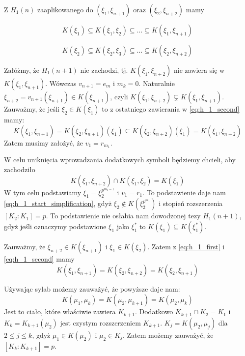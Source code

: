 Z $H_1(n)$ zaaplikowanego do $\left(\xi_1, \xi_{n+1}\right)$ oraz $\left(\xi_2,
\xi_{n+2}\right)$ mamy

\begin{equation}
  K\left(\xi_1\right) \subseteq
  K\left(\xi_1, \xi_2\right) \subseteq
  \ldots \subseteq
  K\left(\xi_1, \xi_{n+1}\right)
  \label{eq:h_1_first}
\end{equation}

\begin{equation}
  K\left(\xi_2\right) \subseteq
  K\left(\xi_2, \xi_3\right) \subseteq
  \ldots \subseteq
  K\left(\xi_2, \xi_{n+2}\right)
  \label{eq:h_1_second}
\end{equation}

Załóżmy, że $H_1(n+1)$ nie zachodzi, tj. $K\left(\xi_1, \xi_{n+2}\right)$ nie
zawiera się w $K\left(\xi_1, \xi_{n+1}\right)$. Wówczas $v_{n+1} = e_m$ i $m_k =
0$.
Naturalnie $\xi_{n+2} = v_{n+1}\left(\xi_{n+1}\right) \in
K\left(\xi_{n+1}\right)$, czyli 
${K\left(\xi_1, \xi_{n+2}\right) \subsetneq
K\left(\xi_1, \xi_{n+1}\right)}$.
Zauważmy, że jeśli $\xi_2 \in K\left(\xi_1\right)$ to z ostatniego zawierania w
\ref{eq:h_1_second} mamy:
\[
  K\left(\xi_1, \xi_{n+1}\right) =
  K\left(\xi_2, \xi_{n+1}\right)\left(\xi_1\right) \subseteq
  K\left(\xi_2, \xi_{n+2}\right)\left(\xi_1\right) =
K\left(\xi_1, \xi_{n+2}\right)\]
Zatem musimy założyć, że $v_1 = r_{m_1}$.

W celu uniknięcia wprowadzania dodatkowych symboli będziemy chcieli, aby
zachodziło 
\begin{equation}
K\left(\xi_1, \xi_{n+2}\right) \cap
K\left(\xi_1, \xi_2\right) = K\left(\xi_1\right)
\label{eq:h_1_start_simplification}
\end{equation}
W tym celu podstawiamy $\xi_1 = \xi_2^{p^{m_1-1}}$ i $v_1 = r_1$. To
podstawienie daje nam \ref{eq:h_1_start_simplification}, gdyż $\xi_2 \not \in
K\left(\xi_2^{p^{m_1}}\right)$ i stopień rozszerzenia $\left[K_2 : K_1\right] =
p$. To podstawienie nie osłabia nam dowodzonej tezy $H_1(n+1)$, gdyż jeśli
oznaczymy podstawione $\xi_1$ jako $\xi_1^*$ to $K\left(\xi_1\right) \subseteq
K\left(\xi_1^*\right)$.

Zauważmy, że
$\xi_{n+2} \in K\left(\xi_{n+1}\right)$ i $\xi_{1} \in K\left(\xi_{2}\right)$.
Zatem z \ref{eq:h_1_first} i \ref{eq:h_1_second} mamy
\[
  K\left(\xi_1, \xi_{n+1}\right) =
  K\left(\xi_2, \xi_{n+2}\right) =
  K\left(\xi_2, \xi_{n+1}\right)
\]

Używając sylab możemy zauważyć, że powyższe daje nam:
\[
  K\left(\mu_1, \mu_{k}\right) =
  K\left(\mu_2, \mu_{k+1}\right) =
  K\left(\mu_2, \mu_{k}\right)
\]
Jest to ciało, które właściwie zawiera $K_{k+1}$. Dodatkowo $K_{k+1} \cap K_2 =
K_1$ i $K_k = K_{k+1}\left(\mu_2\right)$ jest czystym rozszerzeniem $K_{k+1}$.
$K_j = K\left(\mu_2, \mu_j\right)$ dla $2 \leq j \leq k$, gdyż $\mu_1 \in
K\left(\mu_2\right)$ i $\mu_2 \in K_j$. Zatem możemy zauważyć, że $\left[K_k :
K_{k+1}\right] = p$.

